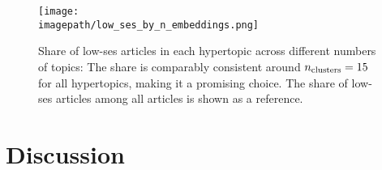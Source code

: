 \begin{figure}
    \centering
    \texttt{[image: \\imagepath/low\_ses\_by\_n\_embeddings.png]}
    \caption{Share of low-\gls{ses} articles in each hypertopic across different numbers of topics: The share is comparably consistent around $n_\text{clusters}=15$ for all hypertopics, making it a promising choice. The share of low-\gls{ses} articles among all articles is shown as a reference.}\label{fig:lowshare_by_nclusters}
\end{figure}

\section{Discussion}